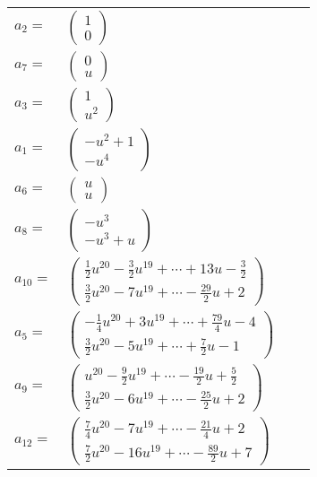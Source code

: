 \documentclass[1p]{elsarticle_modified}
\theoremstyle{definition}
\begin{document}
\begin{tabular}{m{7pt} m{180pt} m{7pt} m{180pt} }
\flushright $a_{2}=$&$\begin{pmatrix}1\\0\end{pmatrix}$ \\
\flushright $a_{7}=$&$\begin{pmatrix}0\\u\end{pmatrix}$ \\
\flushright $a_{3}=$&$\begin{pmatrix}1\\u^2\end{pmatrix}$ \\
\flushright $a_{1}=$&$\begin{pmatrix}- u^2+1\\- u^4\end{pmatrix}$ \\
\flushright $a_{6}=$&$\begin{pmatrix}u\\u\end{pmatrix}$ \\
\flushright $a_{8}=$&$\begin{pmatrix}- u^3\\- u^3+u\end{pmatrix}$ \\
\flushright $a_{10}=$&$\begin{pmatrix}\frac{1}{2} u^{20}-\frac{3}{2} u^{19}+\cdots+13 u-\frac{3}{2}\\\frac{3}{2} u^{20}-7 u^{19}+\cdots-\frac{29}{2} u+2\end{pmatrix}$ \\
\flushright $a_{5}=$&$\begin{pmatrix}-\frac{1}{4} u^{20}+3 u^{19}+\cdots+\frac{79}{4} u-4\\\frac{3}{2} u^{20}-5 u^{19}+\cdots+\frac{7}{2} u-1\end{pmatrix}$ \\
\flushright $a_{9}=$&$\begin{pmatrix}u^{20}-\frac{9}{2} u^{19}+\cdots-\frac{19}{2} u+\frac{5}{2}\\\frac{3}{2} u^{20}-6 u^{19}+\cdots-\frac{25}{2} u+2\end{pmatrix}$ \\
\flushright $a_{12}=$&$\begin{pmatrix}\frac{7}{4} u^{20}-7 u^{19}+\cdots-\frac{21}{4} u+2\\\frac{7}{2} u^{20}-16 u^{19}+\cdots-\frac{89}{2} u+7\end{pmatrix}$ \\

\end{tabular}
\end{document}
